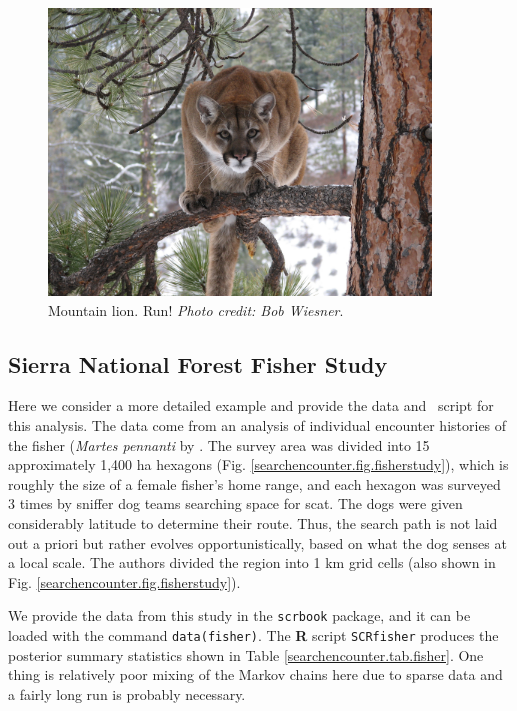 \begin{figure}
\centering
\includegraphics[height=3in]{Ch15-searchencounter/figs/mountain_lion.jpg}
\caption{
Mountain lion.
Run!
{\it Photo credit: Bob Wiesner}.
}
\label{searchencounter.fig.lion}
\end{figure}

\subsection{Sierra National Forest Fisher Study}

Here we consider a more detailed example and provide the data and
\R~script for this analysis.  The data come from an analysis of
individual encounter histories of the fisher ({\it Martes pennanti} by
\citet{thompson_etal:2012}.  The survey area was divided into 15
approximately 1,400 ha hexagons
(Fig. \ref{searchencounter.fig.fisherstudy}), which is roughly the
size of a female fisher's home range, and each hexagon was surveyed 3
times by sniffer dog teams searching space for scat. The dogs were
given considerably latitude to determine their route.  Thus, the
search path is not laid out a priori but rather evolves
opportunistically, based on what the dog senses at a local scale.  The
authors divided the region into 1 km grid cells (also shown in Fig.
\ref{searchencounter.fig.fisherstudy}).

We provide the
data from this study in the \mbox{\tt scrbook} package, and it can be
loaded with the command \mbox{\tt data(fisher)}.
The {\bf R} script
 \mbox{\tt SCRfisher}  produces the posterior summary
statistics shown in Table
\ref{searchencounter.tab.fisher}.
One thing is relatively poor mixing of the Markov chains here due to
sparse data and a fairly long run is probably necessary.


